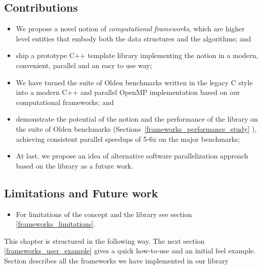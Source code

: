 \subsection{Contributions}
\begin{itemize}[style=unboxed,leftmargin=0cm]
\itemsep0em
\renewcommand\labelitemi{$\vartriangleright$}
\renewcommand\labelitemii{$\bullet$}
\item We propose a novel notion of \textit{computational frameworks}, which are higher level entities that embody both the data structures and the algorithms; and
\item ship a prototype C++ template library implementing the notion in a modern, convenient, parallel and an easy to use way;
\item We have turned the suite of Olden benchmarks written in the legacy C style into a modern C++ and parallel OpenMP implementation based on our computational frameworks; and
\item demonstrate the potential of the notion and the performance of the library on the suite of Olden benchmarks (Sections~\ref{frameworks_performance_study} ), achieving consistent parallel speedups of 5-6x on the major benchmarks;
\item At last, we propose an idea of alternative software parallelization approach based on the library as a future work.
\end{itemize}

\subsection{Limitations and Future work}
\begin{itemize}[style=unboxed,leftmargin=0cm]
\itemsep0em
\renewcommand\labelitemi{$\vartriangleright$}
\renewcommand\labelitemii{$\bullet$}
\item For limitations of the concept and the library see section \ref{frameworks_limitations}.
\end{itemize}
\quad This chapter is structured in the following way. The next section \ref{frameworks_user_example} gives a quick how-to-use and an initial feel example. Section describes all the frameworks we have implemented in our library

